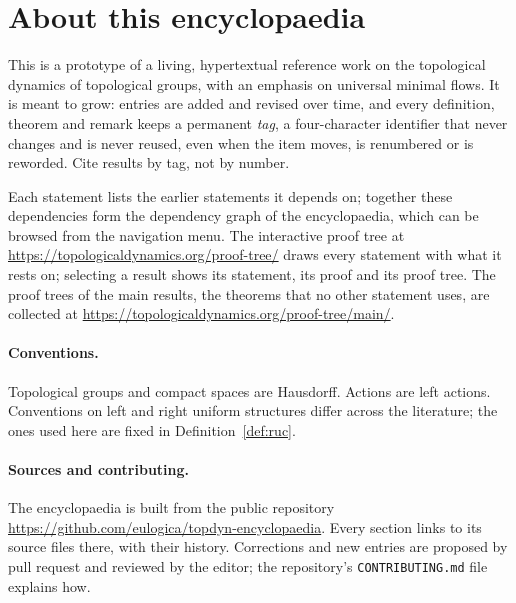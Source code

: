 \section{About this encyclopaedia}\label{sec:about}

This is a prototype of a living, hypertextual reference work on the topological
dynamics of topological groups, with an emphasis on universal minimal flows. It
is meant to grow: entries are added and revised over time, and every
definition, theorem and remark keeps a permanent \emph{tag}, a four-character
identifier that never changes and is never reused, even when the item moves,
is renumbered or is reworded. Cite results by tag, not by number.

Each statement lists the earlier statements it depends on; together these
dependencies form the dependency graph of the encyclopaedia, which can be
browsed from the navigation menu. The interactive proof tree at
\url{https://topologicaldynamics.org/proof-tree/} draws every statement with
what it rests on; selecting a result shows its statement, its proof and its
proof tree. The proof trees of the main results, the theorems that no other
statement uses, are collected at
\url{https://topologicaldynamics.org/proof-tree/main/}.

\paragraph{Conventions.} Topological groups and compact spaces are Hausdorff.
Actions are left actions. Conventions on left and right uniform structures
differ across the literature; the ones used here are fixed in
Definition~\ref{def:ruc}.

\paragraph{Sources and contributing.} The encyclopaedia is built from the
public repository
\url{https://github.com/eulogica/topdyn-encyclopaedia}. Every section links
to its source files there, with their history. Corrections and new entries are
proposed by pull request and reviewed by the editor; the repository's
\texttt{CONTRIBUTING.md} file explains how.

